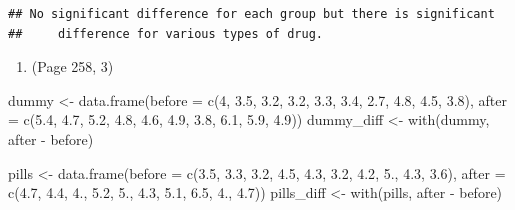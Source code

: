 \documentclass{article}
\newenvironment{Shaded}{\begin{snugshade}}{\end{snugshade}}
\newcommand{\AttributeTok}[1]{\textcolor[rgb]{0.77,0.63,0.00}{#1}}
\newcommand{\DecValTok}[1]{\textcolor[rgb]{0.00,0.00,0.81}{#1}}
\newcommand{\FloatTok}[1]{\textcolor[rgb]{0.00,0.00,0.81}{#1}}
\newcommand{\FunctionTok}[1]{\textcolor[rgb]{0.00,0.00,0.00}{#1}}
\newcommand{\NormalTok}[1]{#1}
\newcommand{\OtherTok}[1]{\textcolor[rgb]{0.56,0.35,0.01}{#1}}
\newcommand{\SpecialCharTok}[1]{\textcolor[rgb]{0.00,0.00,0.00}{#1}}
\begin{document}
\begin{verbatim}
## No significant difference for each group but there is significant 
##     difference for various types of drug.
\end{verbatim}

\begin{enumerate}
\def\labelenumi{\arabic{enumi}.}
\setcounter{enumi}{2}
\tightlist
\item
  (Page 258, 3)
\end{enumerate}

\begin{Shaded}
\begin{Highlighting}[]
\NormalTok{dummy }\OtherTok{\textless{}{-}} \FunctionTok{data.frame}\NormalTok{(}\AttributeTok{before =} \FunctionTok{c}\NormalTok{(}\DecValTok{4}\NormalTok{, }\FloatTok{3.5}\NormalTok{, }\FloatTok{3.2}\NormalTok{, }\FloatTok{3.2}\NormalTok{, }\FloatTok{3.3}\NormalTok{, }\FloatTok{3.4}\NormalTok{, }\FloatTok{2.7}\NormalTok{, }\FloatTok{4.8}\NormalTok{, }\FloatTok{4.5}\NormalTok{, }\FloatTok{3.8}\NormalTok{), }
                    \AttributeTok{after =} \FunctionTok{c}\NormalTok{(}\FloatTok{5.4}\NormalTok{, }\FloatTok{4.7}\NormalTok{, }\FloatTok{5.2}\NormalTok{, }\FloatTok{4.8}\NormalTok{, }\FloatTok{4.6}\NormalTok{, }\FloatTok{4.9}\NormalTok{, }\FloatTok{3.8}\NormalTok{, }\FloatTok{6.1}\NormalTok{, }\FloatTok{5.9}\NormalTok{, }\FloatTok{4.9}\NormalTok{))}
\NormalTok{dummy\_diff }\OtherTok{\textless{}{-}} \FunctionTok{with}\NormalTok{(dummy, after }\SpecialCharTok{{-}}\NormalTok{ before)}

\NormalTok{pills }\OtherTok{\textless{}{-}} \FunctionTok{data.frame}\NormalTok{(}\AttributeTok{before =} \FunctionTok{c}\NormalTok{(}\FloatTok{3.5}\NormalTok{, }\FloatTok{3.3}\NormalTok{, }\FloatTok{3.2}\NormalTok{, }\FloatTok{4.5}\NormalTok{, }\FloatTok{4.3}\NormalTok{, }\FloatTok{3.2}\NormalTok{, }\FloatTok{4.2}\NormalTok{, }\FloatTok{5.}\NormalTok{, }\FloatTok{4.3}\NormalTok{, }\FloatTok{3.6}\NormalTok{), }
                    \AttributeTok{after =} \FunctionTok{c}\NormalTok{(}\FloatTok{4.7}\NormalTok{, }\FloatTok{4.4}\NormalTok{, }\FloatTok{4.}\NormalTok{, }\FloatTok{5.2}\NormalTok{, }\FloatTok{5.}\NormalTok{, }\FloatTok{4.3}\NormalTok{, }\FloatTok{5.1}\NormalTok{, }\FloatTok{6.5}\NormalTok{, }\FloatTok{4.}\NormalTok{, }\FloatTok{4.7}\NormalTok{))}
\NormalTok{pills\_diff }\OtherTok{\textless{}{-}} \FunctionTok{with}\NormalTok{(pills, after }\SpecialCharTok{{-}}\NormalTok{ before)}


\end{Highlighting}
\end{Shaded}
\end{document}
